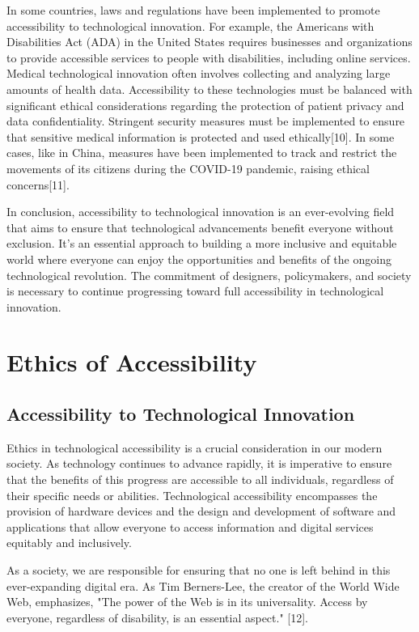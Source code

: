 In some countries, laws and regulations have been implemented to promote accessibility to technological innovation. For example, the Americans with Disabilities Act (ADA) in the United States requires businesses and organizations to provide accessible services to people with disabilities, including online services. Medical technological innovation often involves collecting and analyzing large amounts of health data. Accessibility to these technologies must be balanced with significant ethical considerations regarding the protection of patient privacy and data confidentiality. Stringent security measures must be implemented to ensure that sensitive medical information is protected and used ethically[10]. In some cases, like in China, measures have been implemented to track and restrict the movements of its citizens during the COVID-19 pandemic, raising ethical concerns[11].

In conclusion, accessibility to technological innovation is an ever-evolving field that aims to ensure that technological advancements benefit everyone without exclusion. It’s an essential approach to building a more inclusive and equitable world where everyone can enjoy the opportunities and benefits of the ongoing technological revolution. The commitment of designers, policymakers, and society is necessary to continue progressing toward full accessibility in technological innovation.

\section{Ethics of Accessibility}
\subsection{Accessibility to Technological Innovation}

Ethics in technological accessibility is a crucial consideration in our modern society. As technology continues to advance rapidly, it is imperative to ensure that the benefits of this progress are accessible to all individuals, regardless of their specific needs or abilities. Technological accessibility encompasses the provision of hardware devices and the design and development of software and applications that allow everyone to access information and digital services equitably and inclusively.

As a society, we are responsible for ensuring that no one is left behind in this ever-expanding digital era. As Tim Berners-Lee, the creator of the World Wide Web, emphasizes, "The power of the Web is in its universality. Access by everyone, regardless of disability, is an essential aspect." [12].

